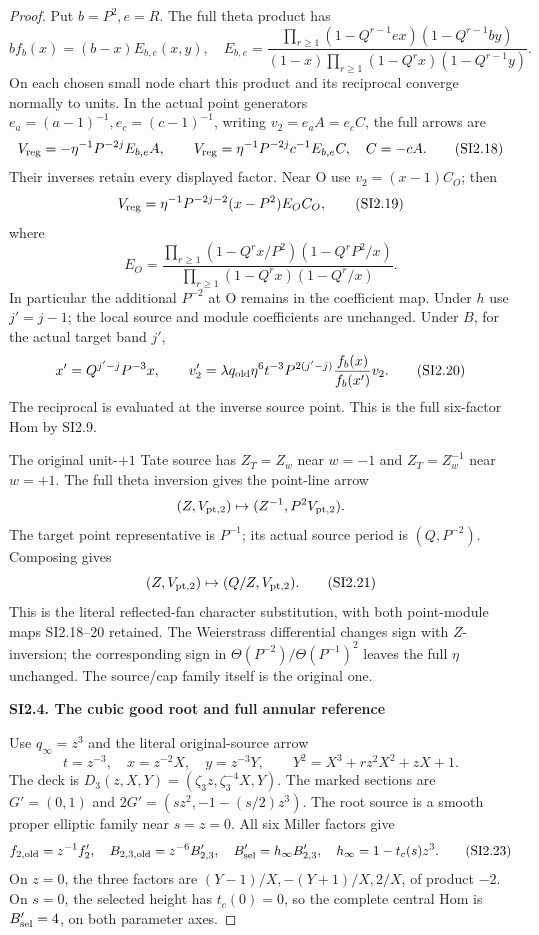 \begin{proof}
Put \(b=P^2,e=R\). The full theta product has
\[
 b f_b(x)=(b-x)E_{b,e}(x,y),
\quad
 E_{b,e}=
 \frac{\prod_{r\ge1}(1-Q^{r-1}ex)(1-Q^{r-1}by)}
 {(1-x)\prod_{r\ge1}(1-Q^rx)(1-Q^{r-1}y)}.
 \tag{SI2.17}
\]
On each chosen small node chart this product and its reciprocal
converge normally to units. In the actual point generators
\(e_a=(a-1)^{-1},e_c=(c-1)^{-1}\), writing
\(v_2=e_a A=e_c C\), the full arrows are
\[
 V_{\rm reg}=-\eta^{-1}P^{-2j}E_{b,e}A,\qquad
 V_{\rm reg}=\eta^{-1}P^{-2j}c^{-1}E_{b,e}C,\quad C=-cA.
 \tag{SI2.18}
\]
Their inverses retain every displayed factor. Near O use
\(v_2=(x-1)C_O\); then
\[
 V_{\rm reg}=\eta^{-1}P^{-2j-2}(x-P^2)E_OC_O,
 \tag{SI2.19}
\]
where
\[
 E_O=
 \frac{\prod_{r\ge1}(1-Q^rx/P^2)(1-Q^rP^2/x)}
 {\prod_{r\ge1}(1-Q^rx)(1-Q^r/x)} .
\]
In particular the additional \(P^{-2}\) at O remains in the
coefficient map. Under \(h\) use \(j'=j-1\); the local source and
module coefficients are unchanged. Under \(B\), for the actual
target band \(j'\),
\[
 x'=Q^{j'-j}P^{-3}x,\qquad
 v_2'=\lambda q_{\rm old}\eta^6t^{-3}P^{2(j'-j)}
                 \frac{f_b(x)}{f_b(x')}v_2.
 \tag{SI2.20}
\]
The reciprocal is evaluated at the inverse source point. This is
the full six-factor Hom by SI2.9.

The original unit-\(+1\) Tate source has
\(Z_T=Z_w\) near \(w=-1\) and \(Z_T=Z_w^{-1}\) near \(w=+1\).
The full theta inversion gives the point-line arrow
\[
 (Z,V_{{\rm pt},2})\mapsto(Z^{-1},P^2V_{{\rm pt},2}).
\]
The target point representative is \(P^{-1}\); its actual source
period is \((Q,P^{-2})\). Composing gives
\[
 (Z,V_{{\rm pt},2})\mapsto(Q/Z,V_{{\rm pt},2}).
 \tag{SI2.21}
\]
This is the literal reflected-fan character substitution, with both
point-module maps SI2.18--20 retained. The Weierstrass differential
changes sign with \(Z\)-inversion; the corresponding sign in
\(\Theta(P^{-2})/\Theta(P^{-1})^2\) leaves the full \(\eta\)
unchanged. The source/cap family itself is the original one.

\par

\medskip\noindent\textbf{SI2.4. The cubic good root and full annular reference}

\par\nobreak

Use \(q_\infty=z^3\) and the literal original-source arrow
\[
 t=z^{-3},\quad x=z^{-2}X,\quad y=z^{-3}Y,\qquad
 Y^2=X^3+r z^2X^2+zX+1 .
 \tag{SI2.22}
\]
The deck is \(D_3(z,X,Y)=(\zeta_3z,\zeta_3^{-4}X,Y)\).
The marked sections are \(G'=(0,1)\) and
\(2G'=(s z^2,-1-(s/2)z^3)\). The root source is a smooth proper
elliptic family near \(s=z=0\).
All six Miller factors give
\[
 f_{2,\rm old}=z^{-1}f'_2,\quad
 B_{2,3,\rm old}=z^{-6}B'_{2,3},\quad
 B'_{\rm sel}=h_\infty B'_{2,3},\quad
 h_\infty=1-t_c(s)z^3 .
 \tag{SI2.23}
\]
On \(z=0\), the three factors are
\((Y-1)/X,-(Y+1)/X,2/X\), of product \(-2\).
On \(s=0\), the selected height has \(t_c(0)=0\), so the complete
central Hom is \(B'_{\rm sel}=4\), on both parameter axes.


\end{proof}
